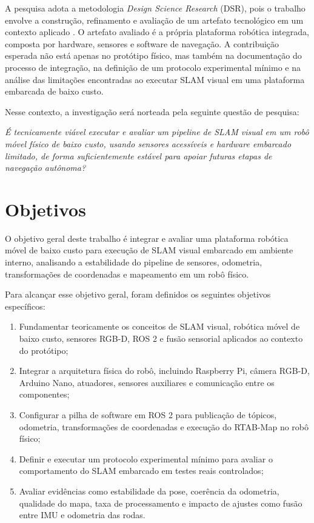 A pesquisa adota a metodologia \textit{Design Science Research} (DSR), pois o trabalho envolve a construção, refinamento e avaliação de um artefato tecnológico em um contexto aplicado \cite{hevner2004designscienceinformation, dresch2015distinctiveanalysiscase}. O artefato avaliado é a própria plataforma robótica integrada, composta por hardware, sensores e software de navegação. A contribuição esperada não está apenas no protótipo físico, mas também na documentação do processo de integração, na definição de um protocolo experimental mínimo e na análise das limitações encontradas ao executar SLAM visual em uma plataforma embarcada de baixo custo.

Nesse contexto, a investigação será norteada pela seguinte questão de pesquisa:

\begin{center}
    \textit{É tecnicamente viável executar e avaliar um pipeline de SLAM visual em um robô móvel físico de baixo custo, usando sensores acessíveis e hardware embarcado limitado, de forma suficientemente estável para apoiar futuras etapas de navegação autônoma?}
\end{center}

\section{Objetivos}

O objetivo geral deste trabalho é integrar e avaliar uma plataforma robótica móvel de baixo custo para execução de SLAM visual embarcado em ambiente interno, analisando a estabilidade do pipeline de sensores, odometria, transformações de coordenadas e mapeamento em um robô físico.

Para alcançar esse objetivo geral, foram definidos os seguintes objetivos específicos:

\begin{enumerate}
    \item Fundamentar teoricamente os conceitos de SLAM visual, robótica móvel de baixo custo, sensores RGB-D, ROS 2 e fusão sensorial aplicados ao contexto do protótipo;
    \item Integrar a arquitetura física do robô, incluindo Raspberry Pi, câmera RGB-D, Arduino Nano, atuadores, sensores auxiliares e comunicação entre os componentes;
    \item Configurar a pilha de software em ROS 2 para publicação de tópicos, odometria, transformações de coordenadas e execução do RTAB-Map no robô físico;
    \item Definir e executar um protocolo experimental mínimo para avaliar o comportamento do SLAM embarcado em testes reais controlados;
    \item Avaliar evidências como estabilidade da pose, coerência da odometria, qualidade do mapa, taxa de processamento e impacto de ajustes como fusão entre IMU e odometria das rodas.
\end{enumerate}

